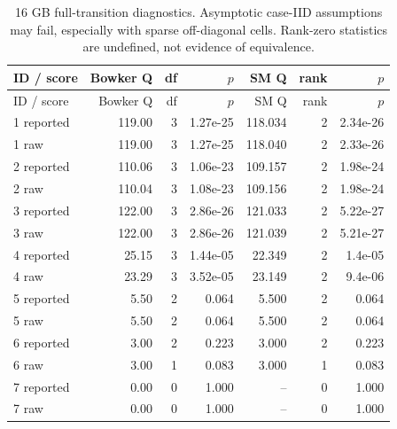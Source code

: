 \begin{longtable}{lrrrrrr}
\caption{16 GB full-transition diagnostics. Asymptotic case-IID assumptions may fail, especially with sparse off-diagonal cells. Rank-zero statistics are undefined, not evidence of equivalence.}\\
ID / score & Bowker Q & df & $p$ & SM Q & rank & $p$\\\toprule\endfirsthead
ID / score & Bowker Q & df & $p$ & SM Q & rank & $p$\\\toprule\endhead
1 reported & 119.00 & 3 & 1.27e-25 & 118.034 & 2 & 2.34e-26\\
1 raw & 119.00 & 3 & 1.27e-25 & 118.040 & 2 & 2.33e-26\\
2 reported & 110.06 & 3 & 1.06e-23 & 109.157 & 2 & 1.98e-24\\
2 raw & 110.04 & 3 & 1.08e-23 & 109.156 & 2 & 1.98e-24\\
3 reported & 122.00 & 3 & 2.86e-26 & 121.033 & 2 & 5.22e-27\\
3 raw & 122.00 & 3 & 2.86e-26 & 121.039 & 2 & 5.21e-27\\
4 reported & 25.15 & 3 & 1.44e-05 & 22.349 & 2 & 1.4e-05\\
4 raw & 23.29 & 3 & 3.52e-05 & 23.149 & 2 & 9.4e-06\\
5 reported & 5.50 & 2 & 0.064 & 5.500 & 2 & 0.064\\
5 raw & 5.50 & 2 & 0.064 & 5.500 & 2 & 0.064\\
6 reported & 3.00 & 2 & 0.223 & 3.000 & 2 & 0.223\\
6 raw & 3.00 & 1 & 0.083 & 3.000 & 1 & 0.083\\
7 reported & 0.00 & 0 & 1.000 & -- & 0 & 1.000\\
7 raw & 0.00 & 0 & 1.000 & -- & 0 & 1.000\\
\bottomrule\end{longtable}